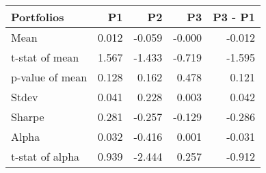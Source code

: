 \begin{tabular}{lrrrr}
\toprule
Portfolios & P1 & P2 & P3 & P3 - P1 \\
\midrule
Mean & 0.012 & -0.059 & -0.000 & -0.012 \\
t-stat of mean & 1.567 & -1.433 & -0.719 & -1.595 \\
p-value of mean & 0.128 & 0.162 & 0.478 & 0.121 \\
Stdev & 0.041 & 0.228 & 0.003 & 0.042 \\
Sharpe & 0.281 & -0.257 & -0.129 & -0.286 \\
Alpha & 0.032 & -0.416 & 0.001 & -0.031 \\
t-stat of alpha & 0.939 & -2.444 & 0.257 & -0.912 \\
\bottomrule
\end{tabular}
